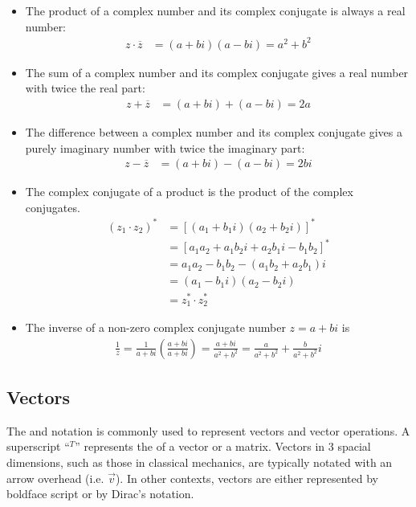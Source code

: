 \begin{itemize}
	\item The product of a complex number and its complex conjugate is always a real number:
	\begin{align}
		z \cdot \overline{z} &= (a+bi)(a-bi) = a^2 + b^2
	\end{align}
	
	\item The sum of a complex number and its complex conjugate gives a real number with twice the real part:
	\begin{align}
		z + \overline{z} &= (a+bi) + (a-bi) = 2a
	\end{align}
	
	\item The difference between a complex number and its complex conjugate gives a purely imaginary number with twice the imaginary part:
	\begin{align}
		z - \overline{z} &= (a+bi) - (a-bi) = 2bi
	\end{align}

	\item The complex conjugate of a product is the product of the complex conjugates.
	\begin{align}
		(z_1 \cdot z_2)^* &= [(a_1+b_1i)(a_2+b_2i)]^* \\ &= [a_1a_2+a_1b_2i+a_2b_1i-b_1b_2]^* \\ &= a_1a_2-b_1b_2 - (a_1b_2+a_2b_1)i \\ &= (a_1-b_1i)(a_2-b_2i) \\
		&= z_1^* \cdot z_2^*
	\end{align}

	\item The inverse of a non-zero complex conjugate number $z=a+bi$ is
	\begin{align}
		\frac{1}{z} = \frac{1}{a+bi}\left(\frac{a+bi}{a+bi}\right) = \frac{a+bi}{a^2+b^2} = \frac{a}{a^2+b^2} + \frac{b}{a^2+b^2}i
	\end{align}
\end{itemize}

\subsection{Vectors}

The  and  notation is commonly used to represent vectors and vector operations. A superscript ``$^T$'' represents the  of a vector or a matrix. Vectors in 3 spacial dimensions, such as those in classical mechanics, are typically notated with an arrow overhead (i.e. $\vec{v}$). In other contexts, vectors are either represented by boldface script or by Dirac's  notation. 

